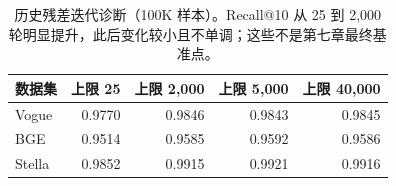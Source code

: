 \begin{table}[tbp]
\centering
\caption[残差训练迭代诊断]{历史残差迭代诊断（100K 样本）。Recall@10 从 25 到 2,000 轮明显提升，此后变化较小且不单调；这些不是第七章最终基准点。}
\label{tab:4-lloyd}
\small
\begin{tabular}{@{}lrrrr@{}}
\toprule
数据集 & 上限 25 & 上限 2,000 & 上限 5,000 & 上限 40,000 \\
\midrule
Vogue & 0.9770 & 0.9846 & 0.9843 & 0.9845 \\
BGE & 0.9514 & 0.9585 & 0.9592 & 0.9586 \\
Stella & 0.9852 & 0.9915 & 0.9921 & 0.9916 \\
\bottomrule
\end{tabular}
\end{table}
